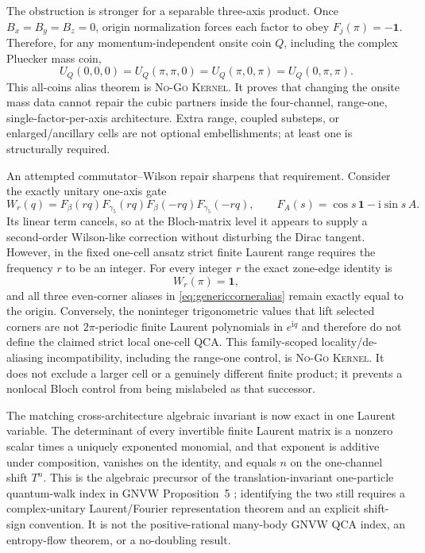 \documentclass[11pt]{article}
\newcommand{\Kernel}{\textcolor{kernelcolor}{\textsc{Kernel}}}
\newcommand{\NoGo}{\textsc{No-Go}}
\newcommand{\ii}{\mathrm{i}}
\newcommand{\id}{\mathbf{1}}
\begin{document}
The obstruction is stronger for a separable three-axis product.  Once
$B_x=B_y=B_z=0$, origin normalization forces each factor to obey
$F_j(\pi)=-\id$.  Therefore, for any momentum-independent onsite coin $Q$,
including the complex Pluecker mass coin,
\begin{equation}\label{eq:genericcorneralias}
 U_Q(0,0,0)=U_Q(\pi,\pi,0)=U_Q(\pi,0,\pi)=U_Q(0,\pi,\pi).
\end{equation}
This all-coins alias theorem is \NoGo{} \Kernel{}.  It proves that changing
the onsite mass data cannot repair the cubic partners inside the
four-channel, range-one, single-factor-per-axis architecture.  Extra range,
coupled substeps, or enlarged/ancillary cells are not optional embellishments;
at least one is structurally required.

An attempted commutator--Wilson repair sharpens that requirement.  Consider
the exactly unitary one-axis gate
\begin{equation}
 W_r(q)=F_{\beta}(rq)F_{\gamma_5}(rq)
        F_{\beta}(-rq)F_{\gamma_5}(-rq),
 \qquad
 F_A(s)=\cos s\,\id-\ii\sin s\,A.
\end{equation}
Its linear term cancels, so at the Bloch-matrix level it appears to supply a
second-order Wilson-like correction without disturbing the Dirac tangent.
However, in the fixed one-cell ansatz strict finite Laurent range requires the
frequency $r$ to be an integer.  For every integer $r$ the exact zone-edge
identity is
\begin{equation}
 W_r(\pi)=\id,
\end{equation}
and all three even-corner aliases in \eqref{eq:genericcorneralias} remain
exactly equal to the origin.  Conversely, the noninteger trigonometric values
that lift selected corners are not $2\pi$-periodic finite Laurent polynomials
in $e^{\ii q}$ and therefore do not define the claimed strict local one-cell
QCA.  This family-scoped locality/de-aliasing incompatibility, including the
range-one control, is \NoGo{} \Kernel{}.  It does not exclude a larger cell or
a genuinely different finite product; it prevents a nonlocal Bloch control
from being mislabeled as that successor.

The matching cross-architecture algebraic invariant is now exact in one
Laurent variable.  The determinant of every invertible finite Laurent matrix
is a nonzero scalar times a uniquely exponented monomial, and that exponent is
additive under composition, vanishes on the identity, and equals $n$ on the
one-channel shift $T^n$.  This is the algebraic precursor of the
translation-invariant one-particle quantum-walk index in GNVW Proposition~5
\cite{GNVW}; identifying the two still requires a complex-unitary
Laurent/Fourier representation theorem and an explicit shift-sign convention.
It is not the positive-rational many-body GNVW QCA index, an entropy-flow
theorem, or a no-doubling result.
\end{document}
